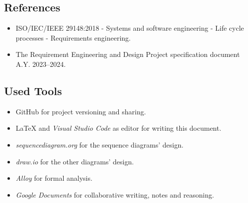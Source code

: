 \subsection{References}
\begin{itemize}
    \item ISO/IEC/IEEE 29148:2018 - Systems and software engineering - Life cycle processes - Requirements engineering.
    \item The Requirement Engineering and Design Project specification document A.Y. 2023–2024. 
\end{itemize}

\subsection{Used Tools}
\begin{itemize}
    \item GitHub for project versioning and sharing.
    \item \LaTeX{} and \textit{Visual Studio Code} as editor for writing this document.
    \item \textit{sequencediagram.org} for the sequence diagrams' design.
    \item \textit{draw.io} for the other diagrams' design.
    \item \textit{Alloy} for formal analysis.
    \item \textit{Google Documents} for collaborative writing, notes and reasoning.
\end{itemize}
